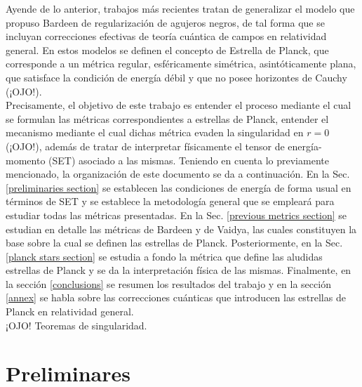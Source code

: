 \documentclass{article}
\numberwithin{equation}{section}
\theoremstyle{definition}
\begin{document}
Ayende de lo anterior, trabajos más recientes \cite{hayward2006,lorenzo,rovelli} tratan de generalizar el modelo que propuso Bardeen de regularización de agujeros negros, de tal forma que se incluyan correcciones efectivas de teoría cuántica de campos en relatividad general. En estos modelos se definen el concepto de Estrella de Planck, que corresponde a un métrica regular, esféricamente simétrica, asintóticamente plana, que satisface la condición de energía débil y que no posee horizontes de Cauchy (¡OJO!).\\

Precisamente, el objetivo de este trabajo es entender el proceso mediante el cual se formulan las métricas correspondientes a estrellas de Planck, entender el mecanismo mediante el cual dichas métrica evaden la singularidad en $r = 0$ (¡OJO!), además de tratar de interpretar físicamente el tensor de energía-momento (SET) asociado a las mismas. Teniendo en cuenta lo previamente mencionado, la organización de este documento se da a continuación. En la Sec. \ref{preliminaries section} se establecen las condiciones de energía de forma usual en términos de SET y se establece la metodología general que se empleará para estudiar todas las métricas presentadas. En la Sec. \ref{previous metrics section} se estudian en detalle las métricas de Bardeen y de Vaidya, las cuales constituyen la base sobre la cual se definen las estrellas de Planck. Posteriormente, en la Sec. \ref{planck stars section} se estudia a fondo la métrica que define las aludidas estrellas de Planck y se da la interpretación física de las mismas. Finalmente, en la sección \ref{conclusions} se resumen los resultados del trabajo y en la sección \ref{annex} se habla sobre las correcciones cuánticas que introducen las estrellas de Planck en relatividad general.\\

¡OJO! Teoremas de singularidad.

\section{\label{preliminaries section} Preliminares}
\end{document}
